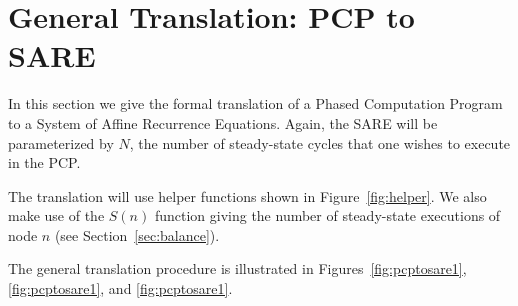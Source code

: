 \section{General Translation: PCP to SARE}
\label{sec:translate}

In this section we give the formal translation of a Phased Computation
Program to a System of Affine Recurrence Equations.  Again, the SARE
will be parameterized by $N$, the number of steady-state cycles that
one wishes to execute in the PCP.  

The translation will use helper functions shown in
Figure~\ref{fig:helper}.  We also make use of the $S(n)$ function
giving the number of steady-state executions of node $n$ (see
Section~\ref{sec:balance}).



The general translation procedure is illustrated in
Figures~\ref{fig:pcptosare1},\ref{fig:pcptosare1}, and
\ref{fig:pcptosare1}.

